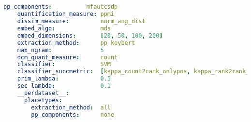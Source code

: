 
% 

\subsection{\textcite{Derrac2015}}
\label{ap:yaml_for_derrac}

\begin{lstlisting}[language=yaml, caption={YAML for \textcite{Derrac2015}}]
    pp_components:          mfautcsdp
    quantification_measure: ppmi
    dissim_measure:         norm_ang_dist
    embed_algo:             mds
    embed_dimensions:       [20, 50, 100, 200]
    extraction_method:      pp_keybert
    max_ngram:              5                   
    dcm_quant_measure:      count
    classifier:             SVM
    classifier_succmetric:  [kappa_count2rank_onlypos, kappa_rank2rank_onlypos_min] 
    prim_lambda:            0.5
    sec_lambda:             0.1
    __perdataset__:
      placetypes:
        extraction_method:  all 
        pp_components:      none
\end{lstlisting}

\subsection{\textcite{Ager2018}}







